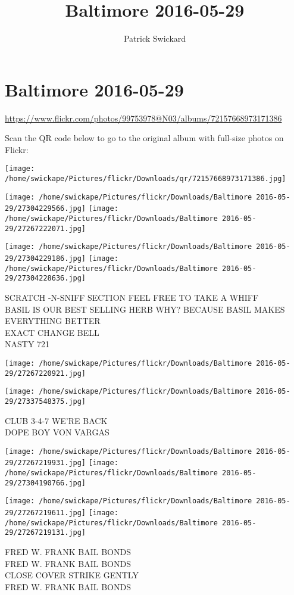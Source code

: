 \documentclass[10pt,letterpaper]{article}
\title{Baltimore 2016-05-29}
\author{Patrick Swickard}
\date{}
\begin{document}
\section*{Baltimore 2016-05-29}

\url{https://www.flickr.com/photos/99753978@N03/albums/72157668973171386}

Scan the QR code below to go to the original album with full-size photos on Flickr:

\texttt{[image: /home/swickape/Pictures/flickr/Downloads/qr/72157668973171386.jpg]}
\pagebreak

\texttt{[image: /home/swickape/Pictures/flickr/Downloads/Baltimore 2016-05-29/27304229566.jpg]}
\texttt{[image: /home/swickape/Pictures/flickr/Downloads/Baltimore 2016-05-29/27267222071.jpg]}

\texttt{[image: /home/swickape/Pictures/flickr/Downloads/Baltimore 2016-05-29/27304229186.jpg]}
\texttt{[image: /home/swickape/Pictures/flickr/Downloads/Baltimore 2016-05-29/27304228636.jpg]}

SCRATCH {-}N{-}SNIFF SECTION FEEL FREE TO TAKE A WHIFF\\
BASIL IS OUR BEST SELLING HERB WHY?  BECAUSE BASIL MAKES EVERYTHING BETTER\\
EXACT CHANGE BELL\\
NASTY 721
\pagebreak

\texttt{[image: /home/swickape/Pictures/flickr/Downloads/Baltimore 2016-05-29/27267220921.jpg]}

\vspace{0.25in}
\texttt{[image: /home/swickape/Pictures/flickr/Downloads/Baltimore 2016-05-29/27337548375.jpg]}

CLUB 3{-}4{-}7 WE'RE BACK\\
DOPE BOY VON VARGAS
\pagebreak

\texttt{[image: /home/swickape/Pictures/flickr/Downloads/Baltimore 2016-05-29/27267219931.jpg]}
\texttt{[image: /home/swickape/Pictures/flickr/Downloads/Baltimore 2016-05-29/27304190766.jpg]}

\texttt{[image: /home/swickape/Pictures/flickr/Downloads/Baltimore 2016-05-29/27267219611.jpg]}
\texttt{[image: /home/swickape/Pictures/flickr/Downloads/Baltimore 2016-05-29/27267219131.jpg]}

FRED W. FRANK BAIL BONDS\\
FRED W. FRANK BAIL BONDS\\
CLOSE COVER STRIKE GENTLY\\
FRED W. FRANK BAIL BONDS
\pagebreak
\end{document}
